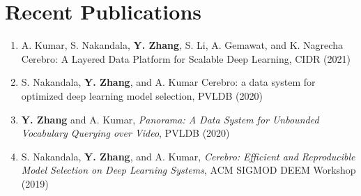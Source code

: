 \documentclass[letterpaper,11pt]{article}
\newcommand{\resumeSubHeadingListStart}{\begin{itemize}[leftmargin=*]}
\newcommand{\resumeSubHeadingListEnd}{\end{itemize}}
\begin{document}
\section{Recent Publications}
\small
\begin{enumerate}
\item A. Kumar, S. Nakandala, \textbf{Y. Zhang}, S. Li, A. Gemawat, and K. Nagrecha Cerebro: A Layered Data Platform for Scalable Deep Learning, CIDR (2021)
\item \textmd{S. Nakandala}, \textbf{Y. Zhang},\textmd{ and A. Kumar} Cerebro: a data system for optimized deep learning model selection, PVLDB (2020)\\
\item \textbf{Y. Zhang}\textmd{ and A. Kumar}, {\slshape Panorama: A Data System for Unbounded Vocabulary Querying over Video}, PVLDB (2020)\\
\item \textmd{S. Nakandala}, \textbf{Y. Zhang},\textmd{ and A. Kumar}, {\slshape Cerebro: Efficient and Reproducible Model Selection on Deep Learning Systems}, ACM SIGMOD DEEM Workshop (2019)\\
\end{enumerate}
%


\end{document}

